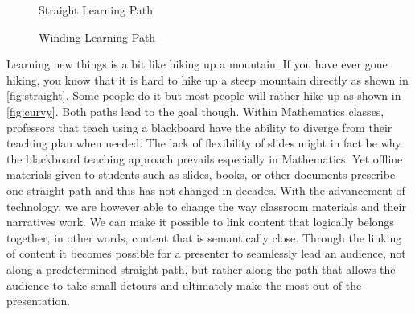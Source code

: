 \documentclass{llncs}
\begin{document}
\begin{figure}
\vspace{-2.2em}\centering
      \vspace{-0.8em}
    \caption{Straight Learning Path}\label{fig:straight}
    \vspace{5pt}  
      \vspace{-0.8em}
      \caption{Winding Learning Path}\label{fig:curvy}
      \vspace{-2.1em}
\end{figure}

Learning new things is a bit like hiking up a mountain. If you have ever gone hiking, you
know that it is hard to hike up a steep mountain directly as shown in
\autoref{fig:straight}. Some people do it but most people will rather hike up as shown in
\autoref{fig:curvy}. Both paths lead to the goal though. Within Mathematics classes, professors that teach using a blackboard have the ability to diverge from their teaching plan when needed. The lack of flexibility of slides might in fact be why the blackboard teaching approach prevails especially in Mathematics. Yet offline materials given to students such as slides, books, or other documents prescribe one straight path and this has not changed in decades. With the advancement of technology, we are however able to change the way classroom materials and their
narratives work. We can make it possible to link content that logically belongs together,
in other words, content that is semantically close. Through the linking of content it
becomes possible for a presenter to seamlessly lead an audience, not along a predetermined
straight path, but rather along the path that allows the audience to take small detours
and ultimately make the most out of the presentation.
\end{document}
